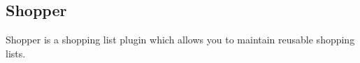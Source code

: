 \subsection{Shopper}
\label{ref:Shopperplugin}

Shopper is a shopping list plugin which allows you to maintain reusable shopping lists.
